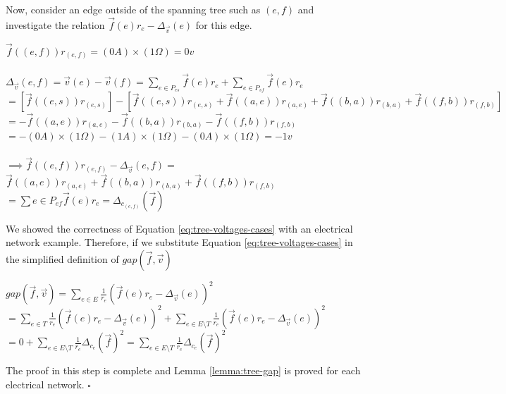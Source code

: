 Now, consider an edge outside of the spanning tree such as $(e,f)$ and investigate the relation $\overrightarrow{f}(e)r_e - \Delta_{\overrightarrow{v}}(e)$ for this edge.
\begin{center}
    $\overrightarrow{f}((e,f))r_{(e,f)} = (0 A) \times (1 \Omega)=0v$\\
    ~\\
    $\Delta_{\overrightarrow{v}}(e,f)=\overrightarrow{v}(e) - \overrightarrow{v} (f) = \sum_{e \in P_{es}} \overrightarrow{f}(e) r_e + \sum_{e \in P_{sf}} \overrightarrow{f}(e) r_e $\\
    $= [\overrightarrow{f}((e,s))r_{(e,s)}]-[\overrightarrow{f}((e,s))r_{(e,s)} + \overrightarrow{f}((a,e))r_{(a,e)} + \overrightarrow{f}((b,a))r_{(b,a)}+ \overrightarrow{f}((f,b))r_{(f,b)}]$\\
    $=-\overrightarrow{f}((a,e))r_{(a,e)} - \overrightarrow{f}((b,a))r_{(b,a)} - \overrightarrow{f}((f,b))r_{(f,b)}$\\
    $=-(0 A) \times (1 \Omega) -(1 A) \times (1 \Omega) -(0 A) \times (1 \Omega)=-1v$\\
    ~\\
    $\implies \overrightarrow{f}((e,f))r_{(e,f)} - \Delta_{\overrightarrow{v}}(e,f)=$\\
    $\overrightarrow{f}((a,e))r_{(a,e)} + \overrightarrow{f}((b,a))r_{(b,a)} + \overrightarrow{f}((f,b))r_{(f,b)}$\\
    $=\sum{e \in P_{ef}}\overrightarrow{f}(e)r_e=\Delta_{c_{(e,f)}}(\overrightarrow{f})$
\end{center}
We showed the correctness of Equation \ref{eq:tree-voltages-cases} with an electrical network example. Therefore, if we substitute Equation \ref{eq:tree-voltages-cases} in the simplified definition of $gap(\overrightarrow{f}, \overrightarrow{v})$
\begin{center}
    $gap(\overrightarrow{f}, \overrightarrow{v})=\sum_{e \in E } \frac{1}{r_e}(\overrightarrow{f}(e)r_e - \Delta_{\overrightarrow{v}}(e))^2$\\
    $=\sum_{e \in T } \frac{1}{r_e}(\overrightarrow{f}(e)r_e - \Delta_{\overrightarrow{v}}(e))^2 + \sum_{e \in E \setminus T } \frac{1}{r_e}(\overrightarrow{f}(e)r_e - \Delta_{\overrightarrow{v}}(e))^2$\\
    $=0+\sum_{e \in E \setminus T} \frac{1}{r_e}\Delta_{c_e}(\overrightarrow{f})^2=\sum_{e \in E \setminus T} \frac{1}{r_e}\Delta_{c_e}(\overrightarrow{f})^2$
\end{center}
The proof in this step is complete and Lemma \ref{lemma:tree-gap} is proved for each electrical network. $\square$

